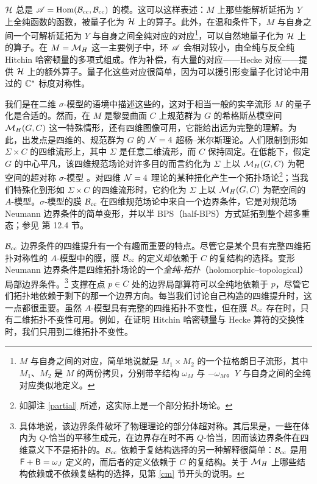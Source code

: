 ${\mathcal H}$ 总是 ${\mathscr A}={\mathrm{Hom}}({\mathcal B}_{\mathrm{cc}},{\mathcal B}_{\mathrm{cc}})$ 的模。这可以这样表述：$M$ 上那些能解析延拓为 $Y$ 上全纯函数的函数，被量子化为 ${\mathcal H}$ 上的算子。此外，在温和条件下，$M$ 与自身之间一个可解析延拓为 $Y$ 与自身之间全纯对应的对应\footnote{$M$ 与自身之间的对应，简单地说就是 $M_1\times M_2$ 的一个拉格朗日子流形，其中 $M_1$、$M_2$ 是 $M$ 的两份拷贝，分别带辛结构 $\omega_M$ 与 $-\omega_M$。$Y$ 与自身之间的全纯对应类似地定义。}，可以自然地量子化为 ${\mathcal H}$ 上的算子。在 $M={\mathcal M}_H$ 这一主要例子中，环 ${\mathscr A}$ 会相对较小，由全纯与反全纯 Hitchin 哈密顿量的多项式组成。作为补偿，有大量的对应——Hecke 对应——提供 ${\mathcal H}$ 上的额外算子。量子化这些对应很简单，因为可以援引形变量子化讨论中用过的 ${\mathbb C}^*$ 标度对称性。

我们是在二维 $\sigma$-模型的语境中描述这些的，这对于相当一般的实辛流形 $M$ 的量子化是合适的。然而，在 $M$ 是黎曼曲面 $C$ 上规范群为 $G$ 的希格斯丛模空间 ${\mathcal M}_H(G,C)$ 这一特殊情形，还有四维图像可用，它能给出远为完整的理解。为此，出发点是四维的、规范群为 $G$ 的 ${\mathcal N}=4$ 超杨–米尔斯理论。人们限制到形如 $\Sigma\times C$ 的四维流形上，其中 $\Sigma$ 是任意二维流形，而 $C$ 保持固定。在低能下，假定 $G$ 的中心平凡，该四维规范场论对许多目的而言约化为 $\Sigma$ 上以 ${\mathcal M}_H(G,C)$ 为靶空间的超对称 $\sigma$-模型 \cite{BJSV,JWS}。对四维 ${\mathcal N}=4$ 理论的某种扭化产生一个拓扑场论\footnote{如脚注 \ref{partial} 所述，这实际上是一个部分拓扑场论。}；当我们特殊化到形如 $\Sigma\times C$ 的四维流形时，它约化为 $\Sigma$ 上以 ${\mathcal M}_H(G,C)$ 为靶空间的 $A$-模型。$\sigma$-模型的膜 ${\mathcal B}_{\mathrm{cc}}$ 在四维规范场论中来自一个边界条件，它是对规范场 Neumann 边界条件的简单变形，并以半 BPS（half-BPS）方式延拓到整个超多重态；参见 \cite{KW} 第 12.4 节。

${\mathcal B}_{\mathrm{cc}}$ 边界条件的四维提升有一个有趣而重要的特点。尽管它是某个具有完整四维拓扑对称性的 $A$-模型中的膜，膜 ${\mathcal B}_{\mathrm{cc}}$ 的定义却依赖于 $C$ 的复结构的选择。变形 Neumann 边界条件是四维拓扑场论的一个\emph{全纯-拓扑}（holomorphic–topological）局部边界条件。\footnote{具体地说，该边界条件破坏了物理理论的部分体超对称。其后果是，一些在体内为 $Q$-恰当的平移生成元，在边界存在时不再 $Q$-恰当，因而该边界条件在四维意义下不是拓扑的。${\mathcal B}_{\mathrm{cc}}$ 依赖于复结构选择的另一种解释很简单：${\mathcal B}_{\mathrm{cc}}$ 是用 ${\sf F}+{\sf B}=\omega_J$ 定义的，而后者的定义依赖于 $C$ 的复结构。关于 ${\mathcal M}_H$ 上哪些结构依赖或不依赖复结构的选择，见第 \ref{cm} 节开头的说明。} 支撑在点 $p\in C$ 处的边界局部算符可以全纯地依赖于 $p$，尽管它们拓扑地依赖于剩下的那一个边界方向。每当我们讨论自己构造的四维提升时，这一点都很重要。虽然 $A$-模型具有完整的四维拓扑不变性，但在膜 ${\mathcal B}_{\mathrm{cc}}$ 存在时，只有二维拓扑不变性可用。例如，在证明 Hitchin 哈密顿量与 Hecke 算符的交换性时，我们只用到二维拓扑不变性。

